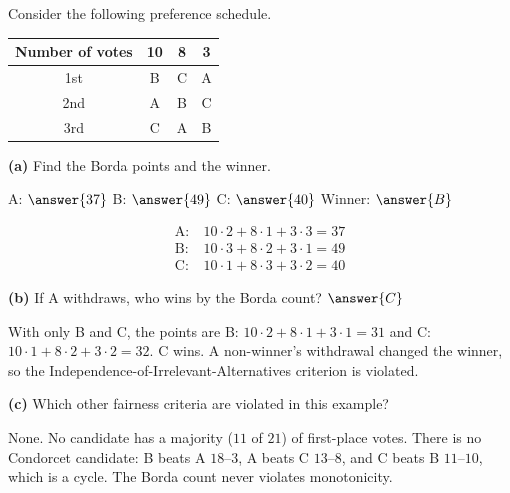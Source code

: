 \documentclass[12pt]{ximera}
\begin{document}
\begin{problem}
Consider the following preference schedule.
\begin{center}
\begin{tabular}{c|ccc}
Number of votes & 10 & 8 & 3\\\hline
1st & B & C & A\\
2nd & A & B & C\\
3rd & C & A & B
\end{tabular}
\end{center}

\begin{prompt}
\textbf{(a)} Find the Borda points and the winner.

A: $\answer{37}$ \quad B: $\answer{49}$ \quad C: $\answer{40}$ \qquad Winner:
$\answer{B}$

\begin{feedback}
\[
\begin{aligned}
\text{A:}&\ 10\cdot2+8\cdot1+3\cdot3=37\\
\text{B:}&\ 10\cdot3+8\cdot2+3\cdot1=49\\
\text{C:}&\ 10\cdot1+8\cdot3+3\cdot2=40
\end{aligned}
\]
\end{feedback}
\end{prompt}

\begin{prompt}
\textbf{(b)} If A withdraws, who wins by the Borda count? $\answer{C}$

\begin{feedback}
With only B and C, the points are B: $10\cdot2+8\cdot1+3\cdot1=31$ and C:
$10\cdot1+8\cdot2+3\cdot2=32$. C wins. A non-winner's withdrawal changed the winner, so
the Independence-of-Irrelevant-Alternatives criterion is violated.
\end{feedback}
\end{prompt}

\begin{prompt}
\textbf{(c)} Which other fairness criteria are violated in this example?

\begin{selectAll}
\end{selectAll}

\begin{feedback}
None. No candidate has a majority ($11$ of $21$) of first-place votes. There is no
Condorcet candidate: B beats A $18$--$3$, A beats C $13$--$8$, and C beats B $11$--$10$,
which is a cycle. The Borda count never violates monotonicity.
\end{feedback}
\end{prompt}
\end{problem}
\end{document}
